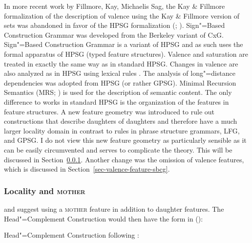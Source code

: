 \largerpage[-1]
In more recent work by Fillmore, Kay, Michaelis \biband Sag, the Kay \& Fillmore formalization of the
description of valence using the Kay \& Fillmore version of sets was abandoned in favor of the HPSG formalization
(\citealp{Kay2005a,Michaelis2006a,Sag2012a}; \citealp*[--11]{SBK2012a}).
Sign"=Based Construction Grammar was developed from the Berkeley variant of CxG.
Sign"=Based Construction Grammar is a variant of HPSG \citep[]{Sag2010b} and as such uses the formal apparatus of HPSG (typed feature structures).
Valence and saturation are treated in exactly the same way as in standard HPSG. Changes
in valence are also analyzed as in HPSG using lexical rules \citep*[Section~2.3]{SBK2012a}.
The analysis of long"=distance dependencies was adopted from HPSG (or
rather GPSG\indexgpsg).
Minimal Recursion Semantics (MRS\indexmrs; \citealp*{CFPS2005a}) is used for the description of semantic content.
The only difference to works in standard HPSG is the organization of the features in feature structures.
A new feature geometry was introduced to rule out constructions that describe daughters of
daughters and therefore have a much larger locality domain in contrast to rules in
phrase structure grammars, LFG, and GPSG. I do not view this new feature geometry as particularly
sensible as it can be easily circumvented and serves to complicate the theory. This will be
discussed in Section~\ref{sec-mother}. Another change was the omission of valence features, which is discussed in Section~\ref{sec-valence-feature-sbcg}.

\subsubsection{Locality and \textsc{mother}}
\label{sec-mother}

\mbox{}\citet*[475--489]{SWB2003a} and \citet{Sag2007a,Sag2012a} suggest using a \textsc{mother} feature in addition to
daughter features. The Head"=Complement Construction would then have the form in ():

\eas
Head"=Complement Construction following \citet*[481]{SWB2003a}:\\
 \impl\\
\zs

